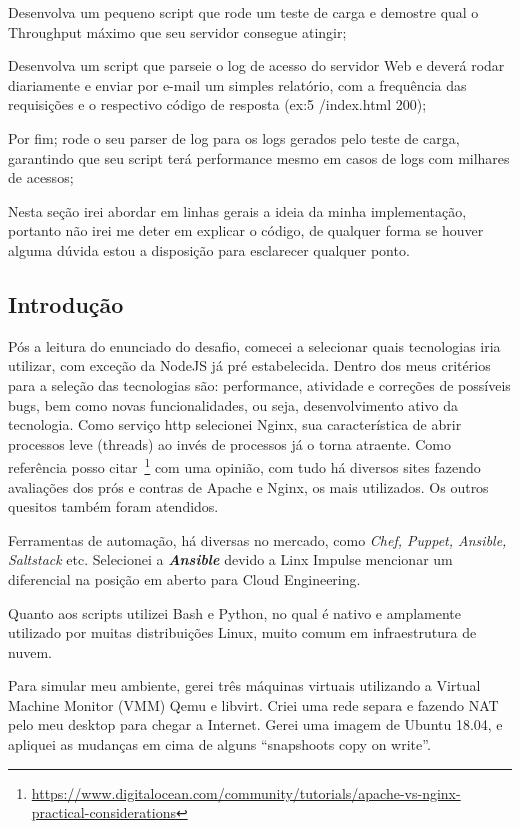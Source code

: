 Desenvolva um pequeno script que rode um teste de carga e demostre
qual o Throughput máximo que seu servidor consegue atingir; 

Desenvolva um script que parseie o log de acesso do servidor Web e
deverá rodar diariamente e enviar por e-mail um simples relatório, com
a frequência das requisições e o respectivo código de resposta (ex:5
/index.html 200); 

Por fim; rode o seu parser de log para os logs gerados pelo teste de
carga, garantindo que seu script terá performance mesmo em casos de
logs com milhares de acessos;

Nesta seção irei abordar em linhas gerais a ideia da minha
implementação, portanto não irei me deter em explicar o código, de
qualquer forma se houver alguma dúvida estou a disposição para
esclarecer qualquer ponto.


\subsection{Introdução}
Pós a leitura do enunciado do desafio, comecei a selecionar quais
tecnologias iria utilizar, com exceção da NodeJS já pré
estabelecida. Dentro dos meus critérios para a seleção das tecnologias
são: performance, atividade e correções de possíveis bugs, bem como
novas funcionalidades, ou seja, desenvolvimento ativo da tecnologia.
Como serviço http selecionei Nginx, sua característica de abrir
processos leve (threads) ao invés de processos já o torna
atraente. Como referência posso
citar~\footnote{\href{https://www.digitalocean.com/community/tutorials/apache-vs-nginx-practical-considerations}{https://www.digitalocean.com/community/tutorials/apache-vs-nginx-practical-considerations}}
com uma opinião, com tudo há diversos sites fazendo avaliações dos
prós e contras de Apache e Nginx, os mais utilizados. Os outros
quesitos também foram atendidos.

Ferramentas de automação, há diversas no mercado, como \emph{Chef, Puppet,
Ansible, Saltstack} etc. Selecionei a \emph{\textbf{Ansible}} devido a Linx Impulse
mencionar um diferencial na posição em aberto para Cloud Engineering.

Quanto aos scripts utilizei Bash e Python, no qual é nativo e
amplamente utilizado por muitas distribuições Linux, muito comum em
infraestrutura de nuvem.

Para simular meu ambiente, gerei três máquinas virtuais utilizando a
Virtual Machine Monitor (VMM) Qemu e libvirt. Criei uma rede separa e
fazendo NAT pelo meu desktop para chegar a Internet. Gerei uma imagem
de Ubuntu 18.04, e apliquei as mudanças em
cima de alguns ``snapshoots copy on write''.

